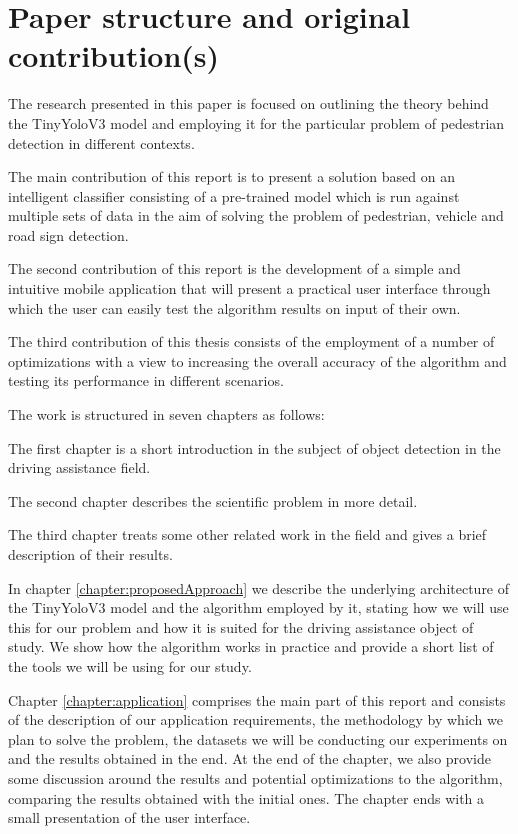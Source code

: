 \documentclass[runningheads,a4paper,11pt]{report}
\begin{document}
\section{Paper structure and original contribution(s)}
\label{section:structure}

The research presented in this paper is focused on outlining the theory behind the TinyYoloV3 model and employing it for the particular problem of pedestrian detection in different contexts.

The main contribution of this report is to present a solution based on an intelligent classifier consisting of a pre-trained model which is run against multiple sets of data in the aim of solving the problem of pedestrian, vehicle and road sign detection.

The second contribution of this report is the development of a simple and intuitive mobile application that will present a practical user interface through which the user can easily test the algorithm results on input of their own.

The third contribution of this thesis consists of the employment of a number of optimizations with a view to increasing the overall accuracy of the algorithm and testing its performance in different scenarios.

The work is structured in seven chapters as follows: 

The first chapter is a short introduction in the subject of object detection in the driving assistance field. 

The second chapter describes the scientific problem in more detail.

The third chapter treats some other related work in the field and gives a brief description of their results.

In chapter \ref{chapter:proposedApproach} we describe the underlying architecture of the TinyYoloV3 model and the algorithm employed by it, stating how we will use this for our problem and how it is suited for the driving assistance object of study. We show how the algorithm works in practice and provide a short list of the tools we will be using for our study.

Chapter \ref{chapter:application} comprises the main part of this report and consists of the description of our application requirements, the methodology by which we plan to solve the problem, the datasets we will be conducting our experiments on and the results obtained in the end. At the end of the chapter, we also provide some discussion around the results and potential optimizations to the algorithm, comparing the results obtained with the initial ones. The chapter ends with a small presentation of the user interface.
\end{document}
